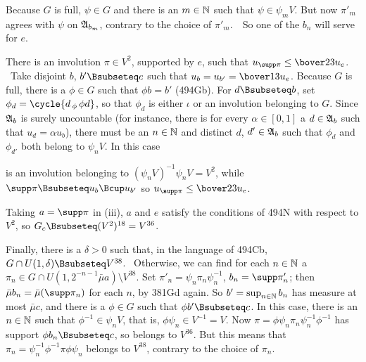 {{

\noindent Because $G$ is full, $\psi\in G$ and
there is an $m\in\Bbb N$ such that
$\psi\in\psi_mV$.   But now $\pi'_m$ agrees with $\psi$ on
$\frak A_{b_m}$, contrary to the choice of $\pi'_m$.\ \BanG\  So one of the
$b_n$ will serve for $e$.\ \Qed

\medskip

 There is an involution $\pi\in V^2$, supported by $e$,
such that $u_{\supp\pi}\le\bover23u_e$.   \Prf\ Take disjoint
$b$, $b'\Bsubseteq e$ such that $u_b=u_{b'}=\bover13u_e$.
Because $G$ is full, there is a $\phi\in G$ such that
$\phi b=b'$ (494Gb).   For $d\Bsubseteq b$, set
$\phi_d=\cycle{d\,_{\phi}\,\phi d}$, so that $\phi_d$ is either $\iota$ or
an involution belonging to $G$.   Since $\frak A_b$ is surely uncountable
(for instance, there is for every $\alpha\in[0,1]$ a $d\in\frak A_b$ such
that $u_d=\alpha u_b$), there must be an $n\in\Bbb N$ and distinct $d$,
$d'\in\frak A_b$ such that $\phi_d$ and $\phi_{d'}$ both belong to
$\psi_nV$.   In this case


\noindent is an involution belonging to $(\psi_nV)^{-1}\psi_nV=V^2$,
while $\supp\pi\Bsubseteq u_b\Bcup u_{b'}$ so
$u_{\supp\pi}\le\bover23u_e$.\ \Qed

\medskip

 Taking $a=\supp\pi$ in (iii), $a$ and $e$ satisfy the
conditions of 494N with respect to $V^2$, so
$G_c\Bsubseteq(V^2)^{18}=V^{36}$.

\medskip

  Finally, there is a $\delta>0$ such that, in the language
of 494Cb,
$G\cap U(1,\delta)\Bsubseteq V^{38}$.   \Prf\Quer\ Otherwise, we can find
for each $n\in\Bbb N$ a
$\pi_n\in G\cap U(1,2^{-n-1}\bar\mu a)\setminus V^{38}$.   Set
$\pi'_n=\psi_n\pi_n\psi_n^{-1}$, $b_n=\supp\pi'_n$;  then
$\bar\mu b_n=\bar\mu(\supp\pi_n)$ for each $n$, by 381Gd again.   So
$b'=\sup_{n\in\Bbb N}b_n$ has measure at most $\bar\mu c$, and there is a
$\phi\in G$ such that $\phi b'\Bsubseteq c$.   In this case,
there is an $n\in\Bbb N$ such that $\phi^{-1}\in\psi_nV$, that is,
$\phi\psi_n\in V^{-1}=V$.   Now
$\pi=\phi\psi_n\pi_n\psi_n^{-1}\phi^{-1}$ has support
$\phi b_n\Bsubseteq c$, so belongs to $V^{36}$.   But this means that
$\pi_n=\psi_n^{-1}\phi^{-1}\pi\phi\psi_n$ belongs to $V^{38}$, contrary to
the choice of $\pi_n$.\ \Bang\Qed

}}
